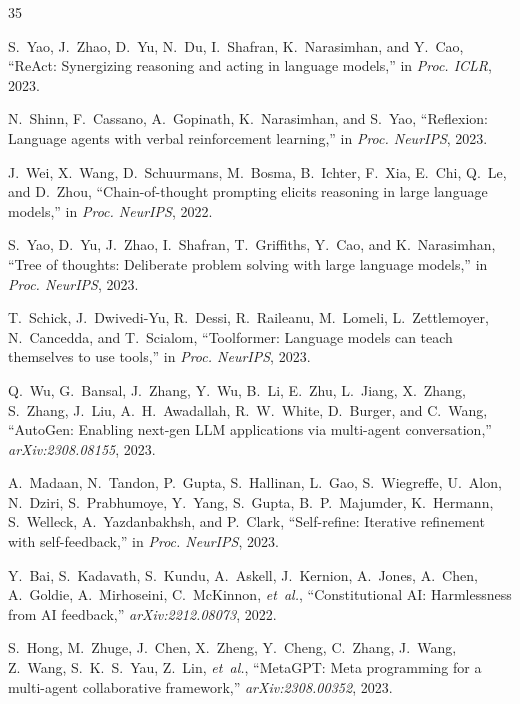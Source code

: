 \documentclass[conference]{IEEEtran}
\begin{document}
\begin{thebibliography}{35}

S.~Yao, J.~Zhao, D.~Yu, N.~Du, I.~Shafran, K.~Narasimhan, and Y.~Cao, ``ReAct: Synergizing reasoning and acting in language models,'' in \textit{Proc. ICLR}, 2023.

N.~Shinn, F.~Cassano, A.~Gopinath, K.~Narasimhan, and S.~Yao, ``Reflexion: Language agents with verbal reinforcement learning,'' in \textit{Proc. NeurIPS}, 2023.

J.~Wei, X.~Wang, D.~Schuurmans, M.~Bosma, B.~Ichter, F.~Xia, E.~Chi, Q.~Le, and D.~Zhou, ``Chain-of-thought prompting elicits reasoning in large language models,'' in \textit{Proc. NeurIPS}, 2022.

S.~Yao, D.~Yu, J.~Zhao, I.~Shafran, T.~Griffiths, Y.~Cao, and K.~Narasimhan, ``Tree of thoughts: Deliberate problem solving with large language models,'' in \textit{Proc. NeurIPS}, 2023.

T.~Schick, J.~Dwivedi-Yu, R.~Dessi, R.~Raileanu, M.~Lomeli, L.~Zettlemoyer, N.~Cancedda, and T.~Scialom, ``Toolformer: Language models can teach themselves to use tools,'' in \textit{Proc. NeurIPS}, 2023.

Q.~Wu, G.~Bansal, J.~Zhang, Y.~Wu, B.~Li, E.~Zhu, L.~Jiang, X.~Zhang, S.~Zhang, J.~Liu, A.~H.~Awadallah, R.~W.~White, D.~Burger, and C.~Wang, ``AutoGen: Enabling next-gen LLM applications via multi-agent conversation,'' \textit{arXiv:2308.08155}, 2023.

A.~Madaan, N.~Tandon, P.~Gupta, S.~Hallinan, L.~Gao, S.~Wiegreffe, U.~Alon, N.~Dziri, S.~Prabhumoye, Y.~Yang, S.~Gupta, B.~P.~Majumder, K.~Hermann, S.~Welleck, A.~Yazdanbakhsh, and P.~Clark, ``Self-refine: Iterative refinement with self-feedback,'' in \textit{Proc. NeurIPS}, 2023.

Y.~Bai, S.~Kadavath, S.~Kundu, A.~Askell, J.~Kernion, A.~Jones, A.~Chen, A.~Goldie, A.~Mirhoseini, C.~McKinnon, \textit{et~al.}, ``Constitutional AI: Harmlessness from AI feedback,'' \textit{arXiv:2212.08073}, 2022.

S.~Hong, M.~Zhuge, J.~Chen, X.~Zheng, Y.~Cheng, C.~Zhang, J.~Wang, Z.~Wang, S.~K.~S.~Yau, Z.~Lin, \textit{et~al.}, ``MetaGPT: Meta programming for a multi-agent collaborative framework,'' \textit{arXiv:2308.00352}, 2023.


\end{thebibliography}
\end{document}
